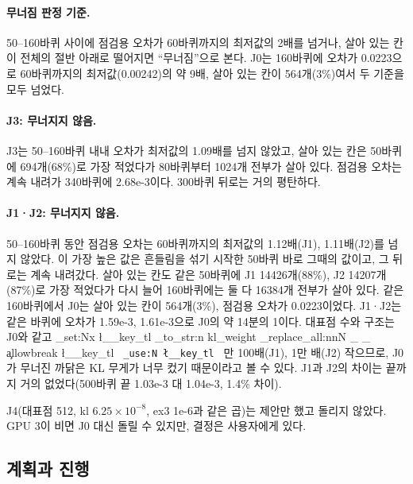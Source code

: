 \documentclass[11pt]{article}
\DeclareRobustCommand{\key}[1]{
  \tl_set:Nx \l__key_tl { \tl_to_str:n {#1} }
  \regex_replace_all:nnN { \_ } { \cO\_ \c{allowbreak} } \l__key_tl
  \texttt{ \tl_use:N \l__key_tl }
}
\begin{document}
\paragraph{무너짐 판정 기준.} 50--160바퀴 사이에 점검용 오차가 60바퀴까지의 최저값의 2배를 넘거나, 살아 있는 칸이 전체의 절반 아래로
떨어지면 ``무너짐''으로 본다. J0는 160바퀴에 오차가 0.0223으로 60바퀴까지의 최저값(0.00242)의 약 9배, 살아 있는 칸이 564개(3\%)여서 두 기준을 모두 넘었다.

\paragraph{J3: 무너지지 않음.} J3는 50--160바퀴 내내 오차가 최저값의 1.09배를 넘지 않았고, 살아 있는 칸은 50바퀴에 694개(68\%)로 가장
적었다가 80바퀴부터 1024개 전부가 살아 있다. 점검용 오차는 계속 내려가 340바퀴에 2.68e-3이다. 300바퀴 뒤로는 거의 평탄하다.

\paragraph{J1·J2: 무너지지 않음.} 50--160바퀴 동안 점검용 오차는 60바퀴까지의 최저값의 1.12배(J1), 1.11배(J2)를 넘지 않았다.
이 가장 높은 값은 흔들림을 섞기 시작한 50바퀴 바로 그때의 값이고, 그 뒤로는 계속 내려갔다. 살아 있는 칸도 같은 50바퀴에
J1 14426개(88\%), J2 14207개(87\%)로 가장 적었다가 다시 늘어 160바퀴에는 둘 다 16384개 전부가 살아 있다.
같은 160바퀴에서 J0는 살아 있는 칸이 564개(3\%), 점검용 오차가 0.0223이었다. J1·J2는 같은 바퀴에 오차가 1.59e-3, 1.61e-3으로
J0의 약 14분의 1이다. 대표점 수와 구조는 J0와 같고 \key{kl_weight}만 100배(J1), 1만 배(J2) 작으므로, J0가 무너진 까닭은
KL 무게가 너무 컸기 때문이라고 볼 수 있다. J1과 J2의 차이는 끝까지 거의 없었다(500바퀴 끝 1.03e-3 대 1.04e-3, 1.4\% 차이).

J4(대표점 512, kl $6.25\times10^{-8}$, ex3 1e-6과 같은 곱)는 제안만 했고 돌리지 않았다. GPU 3이 비면 J0 대신 돌릴 수 있지만, 결정은 사용자에게 있다.

\subsection{계획과 진행}
\end{document}
